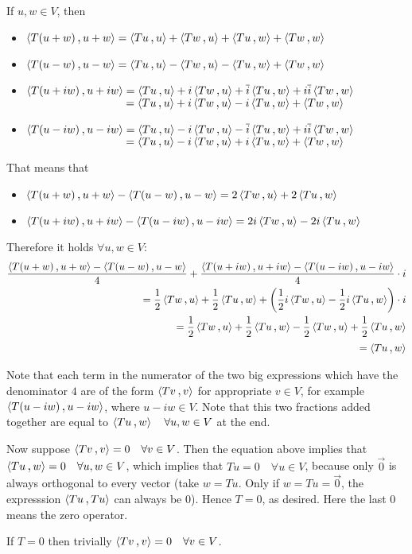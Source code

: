 \begin{prf}
   If $u,w \in V$, then
  \begin{itemize}
    \item $\ip{T(u+w)}{u+w} = \ip{Tu}{u} + \ip{Tw}{u} + \ip{Tu}{w} + \ip{Tw}{w}$
    \item $\ip{T(u-w)}{u-w} = \ip{Tu}{u} - \ip{Tw}{u} - \ip{Tu}{w} + \ip{Tw}{w}$
    \item $\ip{T(u+iw)}{u+iw} = \ip{Tu}{u} + i\ip{Tw}{u} + \overline i \ip{Tu}{w} + i \overline i \ip{Tw}{w}$ \\
    $\phantom{\ip{T(u+iw)}{u+iw} } = \ip{Tu}{u} + i \ip{Tw}{u} - i\ip{Tu}{w} + \ip{Tw}{w}$
    \item $\ip{T(u-iw)}{u-iw} = \ip{Tu}{u} - i\ip{Tw}{u} - \overline i \ip{Tu}{w} + i \overline i \ip{Tw}{w}$ \\
    $\phantom{\ip{T(u+iw)}{u+iw} } = \ip{Tu}{u} - i \ip{Tw}{u} + i\ip{Tu}{w} + \ip{Tw}{w}$
  \end{itemize}

  That means that
  \begin{itemize}
    \item $\ip{T(u+w)}{u+w} - \ip{T(u-w)}{u-w} = 2 \ip{Tw}{u} + 2 \ip{Tu}{w}$
    \item $\ip{T(u+iw)}{u+iw} - \ip{T(u-iw)}{u-iw} = 2i \ip{Tw}{u} - 2i\ip{Tu}{w}$
  \end{itemize}

  Therefore it holds $\forall u,w \in V$:
  \setlength{\abovedisplayskip}{0.6em}
  \[
  \begin{aligned}
      \frac{\ip{T(u+w)}{u+w} - \ip{T(u-w)}{u-w}}{4}
    +
    \frac{\ip{T(u+iw)}{u+iw} - \ip{T(u-iw)}{u-iw}}{4} \cdot i \\
    = \frac{1}{2} \ip{Tw}{u} + \frac{1}{2} \ip{Tu}{w} + \left(\frac{1}{2}i \ip{Tw}{u} - \frac{1}{2}i\ip{Tu}{w} \right)\cdot i \\
    = \frac{1}{2} \ip{Tw}{u} + \frac{1}{2} \ip{Tu}{w} - \frac{1}{2} \ip{Tw}{u} + \frac{1}{2}\ip{Tu}{w} \\
    = \ip{Tu}{w}
  \end{aligned}
  \]
  \setlength{\abovedisplayskip}{0em} %

  Note that each term in the numerator of the two big expressions which have the denominator $4$ are of the form $\ip{Tv}{v}$ for appropriate $v \in V$, for example $\ip{T(u-iw)}{u-iw}$, where $u-iw \in V$. Note that this two fractions added together are equal to $\ip{Tu}{w} \quad \forall u,w \in V$ at the end.

  Now suppose $\ip{Tv}{v} = 0 \quad \forall v \in V$. Then the equation above implies that $\ip{Tu}{w} = 0 \quad \forall u, w \in V$, which implies that $Tu=0 \quad \forall u \in V$, because only $\vec 0$ is always orthogonal to every vector (take $w=Tu$. Only if $w=Tu=\vec 0$, the expresssion $\ip{Tu}{Tu}$ can always  be $0$). Hence $T=0$, as desired. Here the last $0$ means the zero operator.

   If $T = 0$ then trivially $\ip{Tv}{v}=0 \quad \forall v \in V$.
\end{prf}

